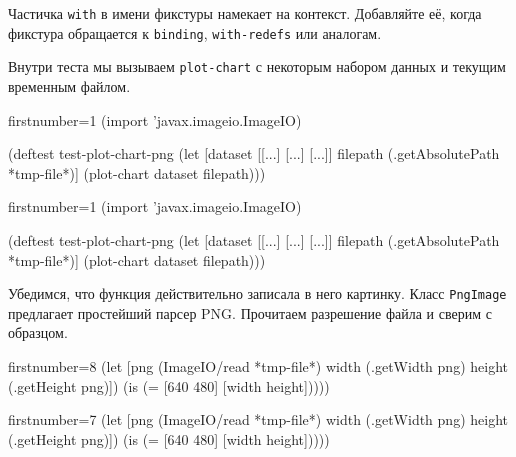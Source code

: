 \fi

Частичка \verb|with| в имени фикстуры намекает на контекст. Добавляйте её,
когда фикстура обращается к \verb|binding|, \verb|with-redefs| или аналогам.


Внутри теста мы вызываем \verb|plot-chart| с некоторым набором данных и текущим
временным файлом.

\ifx\devicetype\mobile

\begin{english}
  \begin{clojure/lines*}{firstnumber=1}
(import 'javax.imageio.ImageIO)

(deftest test-plot-chart-png
 (let [dataset [[...] [...] [...]]
       filepath (.getAbsolutePath
                          *tmp-file*)]
   (plot-chart dataset filepath)))
  \end{clojure/lines*}
\end{english}

\else

\begin{english}
  \begin{clojure/lines*}{firstnumber=1}
(import 'javax.imageio.ImageIO)

(deftest test-plot-chart-png
  (let [dataset [[...] [...] [...]]
        filepath (.getAbsolutePath *tmp-file*)]
    (plot-chart dataset filepath)))
  \end{clojure/lines*}
\end{english}

\fi

\wavebottom

\noindent
Убедимся, что функция действительно записала в него картинку. Класс
\verb|PngImage| предлагает простейший парсер PNG. Прочитаем разрешение файла и
сверим с образцом.

\wavetop

\ifx\devicetype\mobile

\begin{english}
  \begin{clojure/lines*}{firstnumber=8}
(let [png (ImageIO/read *tmp-file*)
      width (.getWidth png)
      height (.getHeight png)])
(is (= [640 480] [width height]))))
  \end{clojure/lines*}
\end{english}

\else

\begin{english}
  \begin{clojure/lines*}{firstnumber=7}
    (let [png (ImageIO/read *tmp-file*)
          width (.getWidth png)
          height (.getHeight png)])
    (is (= [640 480] [width height]))))
  \end{clojure/lines*}
\end{english}
\fi


